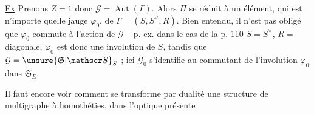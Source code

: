 \uline{Ex} Prenons $Z=1$ donc $\mathcal G=\operatorname{Aut}(\Gamma)$. Alors $\Pi$ se réduit à un élément, qui est n'importe quelle jauge $\varphi_0$, de $\Gamma=(S,S^\vee,R)$. Bien entendu, il n'est pas obligé que $\varphi_0$ commute à l'action de $\mathcal G$ -- p. ex. dans le cas de la p. 110 $S=S^\vee$, $R={}$ diagonale, $\varphi_0$ est donc une involution de $S$, tandis que $\mathcal G=\unsure{\mathfrak S|\mathscr S}_S$ ; ici $\mathcal G_0$ s'identifie au commutant de l'involution $\varphi_0$ dans $\mathfrak S_{E}$. 

Il faut encore voir comment se transforme par dualité une structure de multigraphe  à homothéties,  dans l'optique présente

